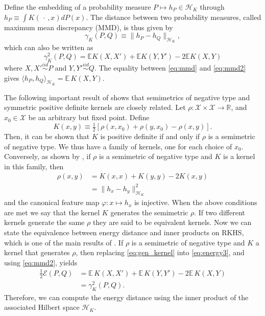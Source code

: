 \documentclass{article}
\newcommand\Energy{\mathcal{E}}
\newcommand\E{\mathbb{E}}
\newcommand\kk{K}
\newcommand\kkk{h}
\newcommand\Hk{{\mathcal{H}}_{\kk}}
\begin{document}
Define the embedding of a probability measure
$P \mapsto \kkk_P \in \Hk$ through
$\kkk_P \equiv \int \kk( \, \cdot \,, x)  d P(x)$. 
The distance between two probability measures, 
called maximum mean discrepancy (MMD), is thus given by
\begin{equation}
\label{eq:mmd}
\gamma_\kk(P,Q) \equiv \| \kkk_P - \kkk_Q \|_{\Hk},
\end{equation}
which can also be written as \citep{Gretton2012}
\begin{equation}\label{eq:mmd2}
\gamma_\kk^2(P,Q) = \E \kk(X,X') + \E \kk(Y,Y') - 2 \E \kk(X, Y)
\end{equation}
where $X,X' \stackrel{iid}{\sim} P$ and $Y,Y'\stackrel{iid}{\sim} Q$.
The equality between \eqref{eq:mmd} and \eqref{eq:mmd2}
gives $\langle \kkk_P, \kkk_Q \rangle_{\Hk} = \E \, \kk(X, Y)$.

The following important result of 
\citet{Berg1984}
shows that semimetrics of negative
type and symmetric positive definite kernels are closely related. 
Let $\rho: \mathcal{X} \times \mathcal{X} \to \mathbb{R}$,
and $x_0 \in \mathcal{X}$ be an arbitrary but fixed point.
Define
\begin{equation}
\label{eq:kernel_semimetric}
\kk(x,y) \equiv 
\tfrac{1}{2} \left[  \rho(x,x_0) + \rho(y,x_0) - \rho(x,y)\right].
\end{equation}
Then, it can be shown that 
$\kk$ is positive definite if and only if $\rho$ is a semimetric
of negative type.
We thus have a family of kernels, one for each choice of $x_0$. Conversely,
as shown by \citet{Sejdinovic2013},
if $\rho$ is a semimetric of negative type and $\kk$ is a kernel in this
family, then 
\begin{equation}
\label{eq:gen_kernel}
\begin{split}
\rho(x,y) &= \kk(x,x) + \kk(y,y) -2\kk(x,y) \\
&=  \| \kkk_x - \kkk_y \|^2_{\Hk}
\end{split}
\end{equation}
and the canonical feature map 
$\varphi: x \mapsto \kkk_x$ is injective. 
When the above conditions are met we say that the kernel $\kk$ 
generates the semimetric $\rho$. 
If two different kernels generate the same $\rho$ they are
said to be equivalent kernels.
Now we can state the equivalence between energy distance and
inner products on RKHS, which is one of the main results of
\citet{Sejdinovic2013}. If $\rho$ is a semimetric
of negative type and $\kk$ a kernel that generates $\rho$, then
replacing \eqref{eq:gen_kernel} into
\eqref{eq:energy3}, and using \eqref{eq:mmd2}, yields
\begin{align}
\tfrac{1}{2}\Energy(P, Q) &= 
\E \, \kk(X, X') + \E \, \kk(Y, Y') - 2\E \, \kk(X, Y) \nonumber \\ 
&= \gamma_\kk^2(P,Q) .
\label{eq:Erho}
\end{align}
Therefore, we can compute the energy distance using the inner product
of the associated Hilbert space $\Hk$.
\end{document}
